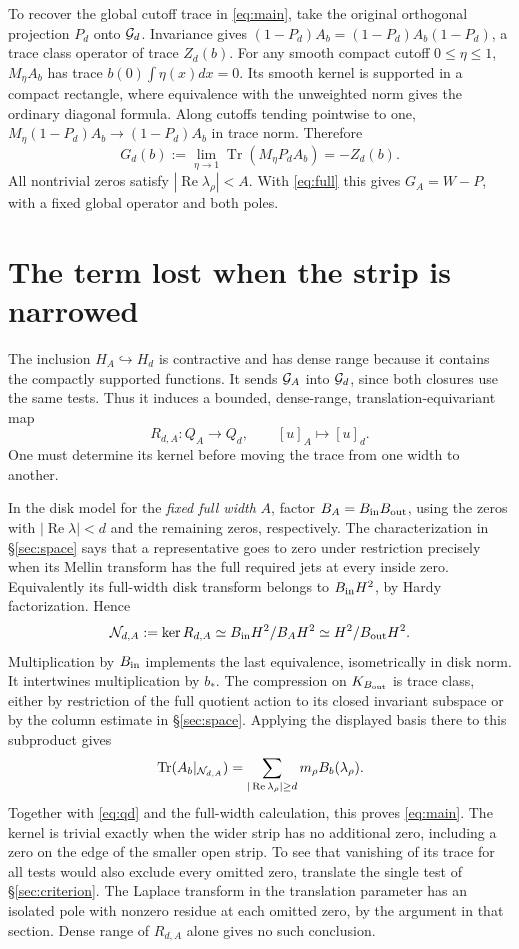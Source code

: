\documentclass[11pt,letterpaper]{article}
\newcommand{\re}{\operatorname{Re}}\newcommand{\im}{\operatorname{Im}}
\newcommand{\Tr}{\operatorname{Tr}}\newcommand{\supp}{\operatorname{supp}}
\newcommand{\partpage}[2]{\clearpage\section{#1}\label{#2}}
\begin{document}
To recover the global cutoff trace in \eqref{eq:main}, take the original orthogonal projection \(P_d\) onto \(\mathcal G_d\). Invariance gives \((1-P_d)A_b=(1-P_d)A_b(1-P_d)\), a trace class operator of trace \(Z_d(b)\). For any smooth compact cutoff \(0\le\eta\le1\), \(M_\eta A_b\) has trace \(b(0)\int\eta(x)dx=0\). Its smooth kernel is supported in a compact rectangle, where equivalence with the unweighted norm gives the ordinary diagonal formula. Along cutoffs tending pointwise to one, \(M_\eta(1-P_d)A_b\to(1-P_d)A_b\) in trace norm. Therefore
\[
 G_d(b):=\lim_{\eta\to1}\Tr(M_\eta P_d A_b)=-Z_d(b).
\]
All nontrivial zeros satisfy \(|\re\lambda_\rho|<A\). With \eqref{eq:full} this gives \(G_A=W-P\), with a fixed global operator and both poles.

\partpage{The term lost when the strip is narrowed}{sec:kernel}
The inclusion \(H_A\hookrightarrow H_d\) is contractive and has dense range because it contains the compactly supported functions. It sends \(\mathcal G_A\) into \(\mathcal G_d\), since both closures use the same tests. Thus it induces a bounded, dense-range, translation-equivariant map
\[
 R_{d,A}:Q_A\longrightarrow Q_d,\qquad [u]_A\longmapsto [u]_d .
\]
One must determine its kernel before moving the trace from one width to another.

In the disk model for the \emph{fixed full width} \(A\), factor \(B_A=B_{\rm in}B_{\rm out}\), using the zeros with \(|\re\lambda|<d\) and the remaining zeros, respectively. The characterization in \S\ref{sec:space} says that a representative goes to zero under restriction precisely when its Mellin transform has the full required jets at every inside zero. Equivalently its full-width disk transform belongs to \(B_{\rm in}H^2\), by Hardy factorization. Hence
\begin{equation}
 \mathcal N_{d,A}:=\ker R_{d,A}
 \simeq {B_{\rm in}H^2}/{B_AH^2}
 \simeq H^2/B_{\rm out}H^2 .
 \label{eq:block}
\end{equation}
Multiplication by \(B_{\rm in}\) implements the last equivalence, isometrically in disk norm. It intertwines multiplication by \(b_*\). The compression on \(K_{B_{\rm out}}\) is trace class, either by restriction of the full quotient action to its closed invariant subspace or by the column estimate in \S\ref{sec:space}. Applying the displayed basis there to this subproduct gives
\[
 \Tr(A_b|_{\Ncal_{d,A}})=
       \sum_{|\re\lambda_\rho|\ge d}m_\rho B_b(\lambda_\rho).
\]
Together with \eqref{eq:qd} and the full-width calculation, this proves \eqref{eq:main}. The kernel is trivial exactly when the wider strip has no additional zero, including a zero on the edge of the smaller open strip. To see that vanishing of its trace for all tests would also exclude every omitted zero, translate the single test of \S\ref{sec:criterion}. The Laplace transform in the translation parameter has an isolated pole with nonzero residue at each omitted zero, by the argument in that section. Dense range of \(R_{d,A}\) alone gives no such conclusion.
\end{document}
